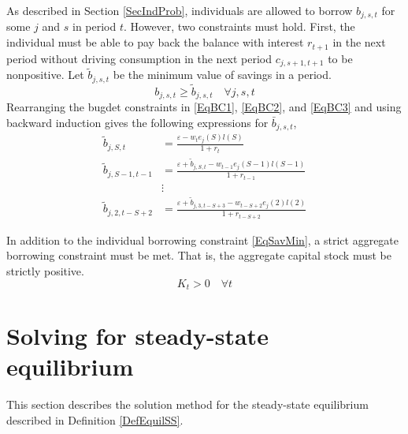 \documentclass[letterpaper,12pt]{article}
\theoremstyle{definition}
\newcommand\ve{\varepsilon}
\renewcommand\theenumi{\roman{enumi}}
\begin{document}
  As described in Section \ref{SecIndProb}, individuals are allowed to borrow $b_{j,s,t}$ for some $j$ and $s$ in period $t$. However, two constraints must hold. First, the individual must be able to pay back the balance with interest $r_{t+1}$ in the next period without driving consumption in the next period $c_{j,s+1,t+1}$ to be nonpositive. Let $\tilde{b}_{j,s,t}$ be the minimum value of savings in a period.
  \begin{equation}\label{EqSavMin}
    b_{j,s,t}\geq\tilde{b}_{j,s,t} \quad\forall j,s,t
  \end{equation}
  Rearranging the bugdet constraints in \eqref{EqBC1}, \eqref{EqBC2}, and \eqref{EqBC3} and using backward induction gives the following expressions for $\bar{b}_{j,s,t}$,
  \begin{equation}\label{EqBorConsts}
    \begin{split}
      \tilde{b}_{j,S,t} &= \frac{\ve - w_te_j(S)l(S)}{1+r_t}  \\
      \tilde{b}_{j,S-1,t-1} &= \frac{\ve + \tilde{b}_{j,S,t} - w_{t-1}e_j(S-1)l(S-1)}{1+r_{t-1}} \\
      &\vdots \\
      \tilde{b}_{j,2,t-S+2} &= \frac{\ve + \tilde{b}_{j,3,t-S+3} - w_{t-S+2}e_j(2)l(2)}{1+r_{t-S+2}}
    \end{split}
  \end{equation}

  In addition to the individual borrowing constraint \eqref{EqSavMin}, a strict aggregate borrowing constraint must be met. That is, the aggregate capital stock must be strictly positive.
  \begin{equation}\label{EqAggrCapConstr}
    K_t > 0 \quad\forall t
  \end{equation}


\newpage
\section{Solving for steady-state equilibrium}\label{AppSSsolve}

  \setcounter{equation}{0}
  \renewcommand\theenumi{\arabic{enumi}}
  \renewcommand\theenumii{\alph{enumii}}
  \renewcommand\theenumiii{\roman{enumiii}}

  This section describes the solution method for the steady-state equilibrium described in Definition \ref{DefEquilSS}.
\end{document}
